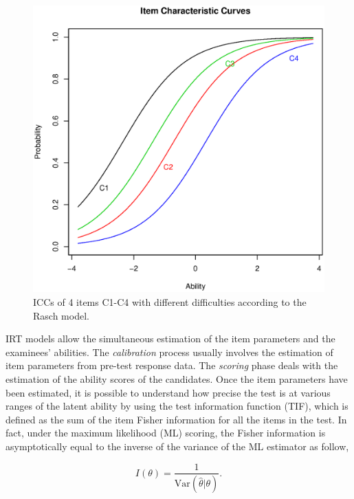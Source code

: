 \begin{figure}[h]
	\centering
	\includegraphics[scale=0.5]{icc.eps}
	\caption{ICCs of 4 items C1-C4 with different difficulties according to the Rasch model.}
	\label{fig:icc}
\end{figure}

IRT models allow the simultaneous estimation of the item parameters and the examinees' abilities.
The \emph{calibration} process usually involves the estimation of item parameters from pre-test response data.
The \emph{scoring} phase deals with the estimation of the ability scores of the candidates.
Once the item parameters have been estimated, it is possible to understand how precise the test is at various ranges of the latent ability by using the test information function (TIF), which is defined as the sum of the item Fisher information for all the items in the test.
In fact, under the maximum likelihood (ML) scoring, the Fisher information is asymptotically equal to the inverse of the variance of the ML estimator as follow,

\begin{equation}
I(\theta)=\frac{1}{\text{Var}(\hat{\theta}| \theta)}.
\end{equation}

